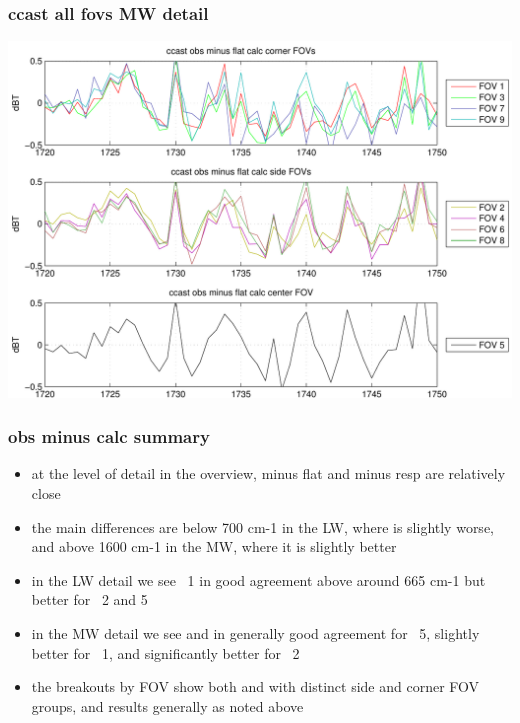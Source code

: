 \documentclass[11pt]{beamer}
\begin{document}
\begin{frame}
\frametitle{ccast all fovs MW detail}
\begin{center}
  \includegraphics[scale=0.5]{figures/cal_ccast_MW.pdf}
\end{center}
\end{frame}
\begin{frame}
\frametitle{obs minus calc summary}

\begin{itemize}

  \item at the level of detail in the overview, {\ccast} minus flat
    and {\noaa} minus resp are relatively close 

  \item the main differences are below 700 cm-1 in the LW, where
    {\ccast} is slightly worse, and above 1600 cm-1 in the MW, where
    it is slightly better

  \item in the LW detail we see \fov~1 in good agreement above
    around 665 cm-1 but {\noaa} better for \fov~2 and 5

  \item in the MW detail we see {\noaa} and {\ccast} in generally
    good agreement for \fov~5,  {\ccast} slightly better for \fov~1, 
    and significantly better for \fov~2

  \item the breakouts by FOV show both {\noaa} and {\ccast} with
    distinct side and corner FOV groups, and results generally as
    noted above

\end{itemize}

\end{frame}
\end{document}
